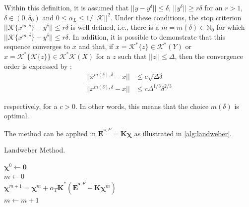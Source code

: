 			Within this definition, it is assumed that $||y-y^\delta||\le\delta$, $||y^\delta||\ge r\delta$ for an $r>1$, $\delta\in(0,\delta_0)$ and $0\le \alpha_L \le 1/||\mathcal{K}||^2$. Under these conditions, the stop criterion $||\mathcal{K}\{x^{m,\delta}\}-y^\delta||\le r\delta$ is well defined, i.e., there is a $m=m(\delta) \in \mathbb{N}_0$ for which $||\mathcal{K}\{x^{m,\delta}\}-y^\delta||\le r\delta$. In addition, it is possible to demonstrate that this sequence converges to $x$ and that, if $x=\mathcal{K}^*\{z\}\in\mathcal{K}^*(Y)$ or $x=\mathcal{K}^*\{\mathcal{K}\{z\}\}\in\mathcal{K}^*\mathcal{K}(X)$ for a $z$ such that $||z||\le \Delta$, then the convergence order is expressed by \citep{kirsch2011introduction}:
			\begin{align}
				||x^{m(\delta),\delta}-x|| &\le c\sqrt{\Delta\delta} \label{eq:3:linear:landweber:error1} \\
				||x^{m(\delta),\delta}-x|| &\le c\Delta^{1/3}\delta^{2/3} \label{eq:3:linear:landweber:error2}
			\end{align}
		
			\noindent respectively, for a $c>0$. In other words, this means that the choice $m(\delta)$ is optimal.
			
			The method can be applied in $\mathbf{\bar{E}}^{\mathbf{s},F} = \mathbf{\bar{K}}\boldsymbol{\chi}$ as illustrated in \autoref{alg:landweber}.
			\begin{algorithm}[!htb]
				\caption{Landweber Method.}
				\label{alg:landweber}
				$\boldsymbol{\chi}^0 \leftarrow \mathbf{0}$ \\
				$m\leftarrow 0$ \\
				 {
					$\boldsymbol{\chi}^{m+1} = \boldsymbol{\chi}^m + \alpha_T\mathbf{\bar{K}}^*\left(\mathbf{\bar{E}}^{\mathbf{s},F}-\mathbf{\bar{K}}\boldsymbol{\chi}^m\right)$ \\
					$m \leftarrow m + 1$ \\
				}
			\end{algorithm}
				
